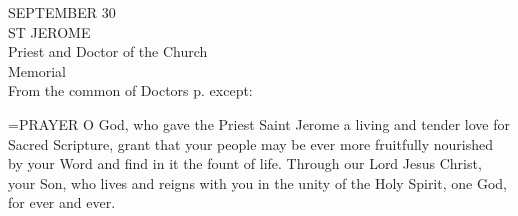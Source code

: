 \begin{center}\normalsize SEPTEMBER 30\\
\footnotesize ST JEROME \\
\footnotesize Priest and Doctor of the Church\\
\footnotesize Memorial\\
\footnotesize From the common of Doctors p.    except:\\
\end{center}

\hangindent=\parindent \small{PRAYER 
O God, who gave the Priest Saint Jerome
a living and tender love for Sacred Scripture,
grant that your people
may be ever more fruitfully nourished by your Word
and find in it the fount of life.
Through our Lord Jesus Christ, your Son,
who lives and reigns with you in the unity of the Holy Spirit,
one God, for ever and ever.\\}
 

